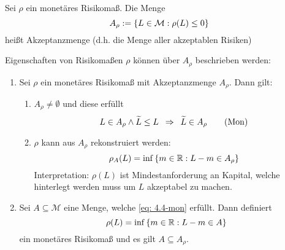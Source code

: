 \begin{*definition}
Sei $\rho$ ein monetäres Risikomaß. Die Menge 
\begin{equation*}
	A_\rho \mathrel{:=} \left\{ L \in \mathcal{M} : \rho(L) \le 0 \right\}
\end{equation*}
heißt Akzeptanzmenge (d.h. die Menge aller akzeptablen Risiken)
\end{*definition}

Eigenschaften von Risikomaßen $\rho$ können über $A_\rho$ beschrieben werden:
\begin{theorem}
\begin{enumerate}[label=\Roman*., nolistsep, leftmargin=*]
	\item Sei $\rho$ ein monetäres Risikomaß mit Akzeptanzmenge $A_\rho$. Dann gilt:
	\begin{enumerate}[label=(\alph*)]
		\item $A_\rho \neq \emptyset$ und diese erfüllt
		\begin{equation*}
			L \in A_\rho \land \widetilde{L} \le L \enskip \Rightarrow \enskip \widetilde{L} \in A_\rho
			\tag{Mon} \label{eq: 4.4-mon}
		\end{equation*}
		\item $\rho$ kann aus $A_\rho$ rekonstruiert werden:
		\begin{equation*}
			\rho_A(L) = \inf\left\{ m \in \mathbb{R} : L - m \in A_\rho \right\}
		\end{equation*}
		Interpretation: $\rho(L)$ ist Mindestanforderung an Kapital, welche hinterlegt werden muss um $L$ akzeptabel zu machen.
	\end{enumerate}
	\item Sei $A \subseteq \mathcal{M}$ eine Menge, welche \eqref{eq: 4.4-mon} erfüllt. Dann definiert
	\begin{equation*}
		\rho(L) = \inf\left\{ m \in \mathbb{R} : L - m \in A \right\}
	\end{equation*}
	ein monetäres Risikomaß und es gilt $A \subseteq A_\rho$.
\end{enumerate}
\end{theorem}

